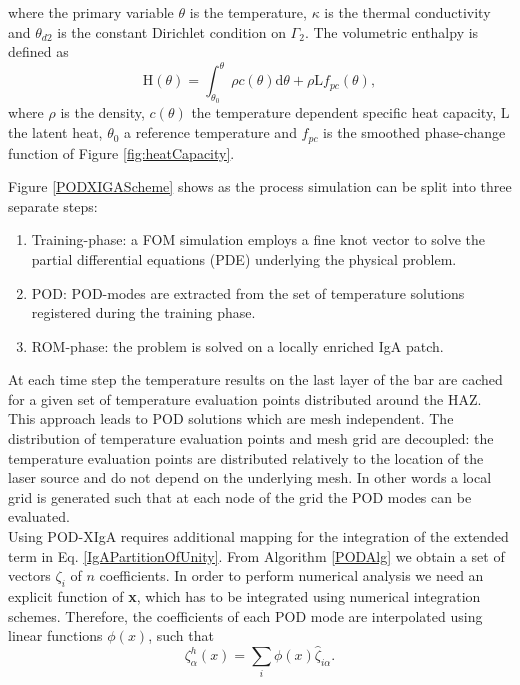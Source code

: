 \documentclass[3p]{article}
\begin{document}
where the primary variable $\theta$ is the temperature, $\kappa$ is the thermal conductivity and $\theta_{d2}$ is the constant Dirichlet condition on $\Gamma_{2}$. The volumetric enthalpy is defined as
\begin{equation}
\mathrm{H}(\theta)=\int_{\theta_{0}}^{\theta}\rho c(\theta) \text{d}\theta+\rho\mathrm{L}f_{pc}(\theta),
\end{equation}
where $\rho$ is the density, $c(\theta)$ the temperature dependent specific heat capacity, $\mathrm{L}$ the latent heat, $\theta_{0}$ a reference temperature and $f_{pc}$ is the smoothed phase-change function of Figure \ref{fig:heatCapacity}.
\par
Figure \ref{PODXIGAScheme} shows as the process simulation can be split into three separate steps:
\begin{enumerate}
\item Training-phase: a FOM simulation employs a fine knot vector to solve the partial differential equations (PDE) underlying the physical problem.
\item POD: POD-modes are extracted from the set of temperature solutions registered during the training phase.
\item ROM-phase: the problem is solved on a locally enriched IgA patch.
\end{enumerate}
At each time step the temperature results on the last layer of the bar are cached for a given set of temperature evaluation points distributed around the HAZ. This approach leads to POD solutions which are mesh independent. The distribution of temperature evaluation points and mesh grid are decoupled: the temperature evaluation points are distributed relatively to the location of the laser source and do not depend on the underlying mesh. In other words a local grid is generated such that at each node of the grid the POD modes can be evaluated. \\
\indent 
Using POD-XIgA requires additional mapping for the integration of the extended term in Eq. \ref{IgAPartitionOfUnity}. From Algorithm \ref{PODAlg} we obtain a set of vectors $\zeta_{i}$ of $n$ coefficients. In order to perform numerical analysis we need an explicit function of \textbf{x}, which has to be integrated using numerical integration schemes. Therefore, the coefficients of each POD mode are interpolated using linear functions $\phi(x)$, such that
\begin{equation}
\zeta_{\alpha}^{h}(x) = \sum_{i}\phi(x)\hat{\zeta}_{i\alpha}.
\end{equation} 
\end{document}
